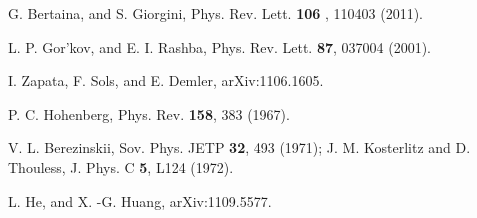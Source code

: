 \documentclass[pra,print,showpacs,superscriptaddress,twocolumn]{revtex4}
\begin{document}
\begin{thebibliography}{99}
 G. Bertaina, and S. Giorgini, Phys. Rev. Lett. \textbf{106%
}, 110403 (2011).

 L. P. Gor'kov, and E. I. Rashba, Phys. Rev. Lett. \textbf{87},
037004 (2001).

 I. Zapata, F. Sols, and E. Demler, arXiv:1106.1605.

 P. C. Hohenberg, Phys. Rev. \textbf{158}, 383 (1967).

 V. L. Berezinskii, Sov. Phys. JETP \textbf{32}, 493 (1971); J.
M. Kosterlitz and D. Thouless, J. Phys. C \textbf{5}, L124 (1972).

 L. He, and X. -G. Huang, arXiv:1109.5577.
\end{thebibliography}
\end{document}
